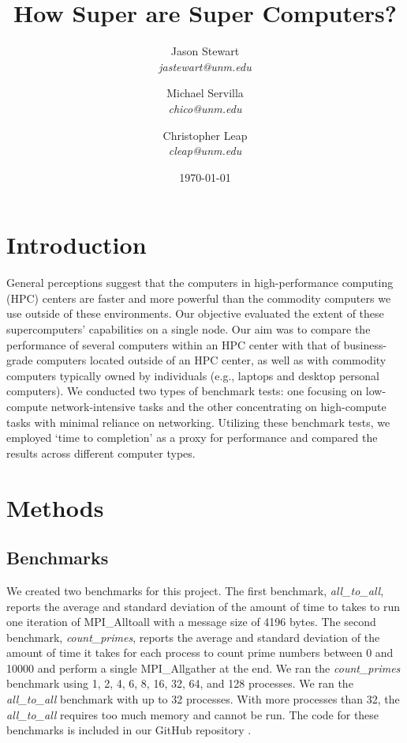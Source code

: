 \documentclass{article}
\title{How Super are Super Computers?}
\author{Jason Stewart\\
\textit{jastewart@unm.edu} 
\and
Michael Servilla\\
\textit{chico@unm.edu}
\and
Christopher Leap\\
\textit{cleap@unm.edu}
\date{\today}
}
\begin{document}
\maketitle

\section{Introduction}
General perceptions suggest that the computers in high-performance computing (HPC) centers are faster and more powerful than the commodity computers we use outside of these environments. Our objective evaluated the extent of these supercomputers' capabilities on a single node. Our aim was to compare the performance of several computers within an HPC center with that of business-grade computers located outside of an HPC center, as well as with commodity computers typically owned by individuals (e.g., laptops and desktop personal computers). We conducted two types of benchmark tests: one focusing on low-compute network-intensive tasks and the other concentrating on high-compute tasks with minimal reliance on networking. Utilizing these benchmark tests, we employed `time to completion' as a proxy for performance and compared the results across different computer types.

\section{Methods}

\subsection{Benchmarks}
We created two benchmarks for this project. The first benchmark, \textit{all\_to\_all}, reports the average and standard deviation of the amount of time to takes to run one iteration of MPI\_Alltoall with a message size of 4196 bytes.
The second benchmark, \textit{count\_primes}, reports the average and standard deviation of the amount of time it takes for each process to count prime numbers between 0 and 10000 and perform a single MPI\_Allgather at the end.
We ran the \textit{count\_primes} benchmark using 1, 2, 4, 6, 8, 16, 32, 64, and 128 processes. We ran the \textit{all\_to\_all} benchmark with up to 32 processes. With more processes than 32, the \textit{all\_to\_all} requires too much memory and cannot be run.
The code for these benchmarks is included in our GitHub repository \cite{repo}.
\end{document}
